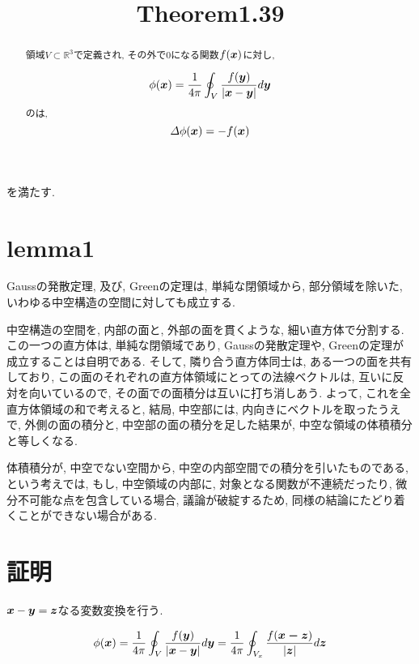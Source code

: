 \documentclass{jsarticle} \usepackage[dvipdfmx]{graphicx} \usepackage[dvipdfmx]{hyperref}
\title{Theorem1.39}
\newcommand*{\mbold}[1]{\mbox{\boldmath $#1$}}
\begin{document}
\maketitle

\begin{abstract}
  領域$V \subset \mathbb{R}^3$で定義され, その外で$0$になる関数$f(\mbold{x})$に対し, 
  
  \begin{equation}
    \phi(\mbold{x}) = \frac{1}{4\pi} \oint_V \frac{f(\mbold{y})}{|\mbold{x} - \mbold{y}|}d\mbold{y}
  \end{equation}
  のは, 
  \begin{equation}
    \varDelta \phi(\mbold{x}) = -f(\mbold{x})
  \end{equation}
\end{abstract}

を満たす. 

\section{lemma1}
Gaussの発散定理, 及び, Greenの定理は, 単純な閉領域から, 部分領域を除いた, いわゆる中空構造の空間に対しても成立する. 

中空構造の空間を, 内部の面と, 外部の面を貫くような, 細い直方体で分割する. 
この一つの直方体は, 単純な閉領域であり, Gaussの発散定理や, Greenの定理が成立することは自明である. 
そして, 隣り合う直方体同士は, ある一つの面を共有しており, この面のそれぞれの直方体領域にとっての法線ベクトルは, 互いに反対を向いているので, 
その面での面積分は互いに打ち消しあう. 
よって, これを全直方体領域の和で考えると, 結局, 中空部には, 内向きにベクトルを取ったうえで, 外側の面の積分と, 中空部の面の積分を足した結果が, 中空な領域の体積積分と等しくなる. 

体積積分が, 中空でない空間から, 中空の内部空間での積分を引いたものである, という考えでは, もし, 中空領域の内部に, 対象となる関数が不連続だったり, 微分不可能な点を包含している場合, 議論が破綻するため, 同様の結論にたどり着くことができない場合がある. 

\section{証明}
$\mbold{x} - \mbold{y} = \mbold{z}$なる変数変換を行う. 

\begin{equation}
  \phi(\mbold{x})
  =
  \frac{1}{4 \pi} \oint_V \frac{f(\mbold{y})}{|\mbold{x} - \mbold{y}|}d\mbold{y}
  = 
  \frac{1}{4 \pi} \oint_{V_x} \frac{f(\mbold{\mbold{x} - \mbold{z}})}{|\mbold{z}|}d\mbold{z}
\end{equation}
\end{document}
